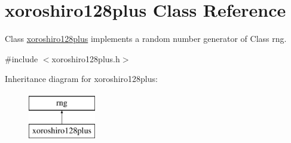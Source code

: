 \hypertarget{classxoroshiro128plus}{}\section{xoroshiro128plus Class Reference}
\label{classxoroshiro128plus}


Class \hyperlink{classxoroshiro128plus}{xoroshiro128plus} implements a random number generator of Class rng.  




{\ttfamily \#include $<$xoroshiro128plus.\+h$>$}

Inheritance diagram for xoroshiro128plus\+:\begin{figure}[H]
\begin{center}
\leavevmode
\includegraphics[height=2.000000cm]{classxoroshiro128plus}
\end{center}
\end{figure}
